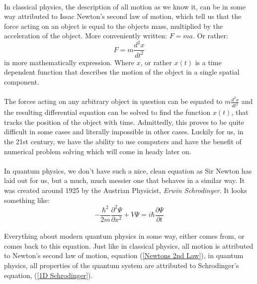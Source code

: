 \documentclass[12pt,letterpaper]{book}
\begin{document}
\paragraph*{}In classical physics, the description of all motion as we know it, can be in some way attributed to Issac Newton's second law of motion, which tell us that the force acting on an object is equal to the objects mass, multiplied by the acceleration of the object. More conveniently written: $F = ma$. Or rather:
\begin{equation}
\label{Newtons 2nd Law}
F = m\frac{d^2x}{dt^2}
\end{equation} 
in more mathematically expression. Where $x$, or rather $x(t)$ is a time dependent function that describes the motion of the object in a single spatial component.
\paragraph*{}The forces acting on any arbitrary object in question can be equated to $m\frac{d^2x}{dt^2}$ and the resulting differential equation can be solved to find the function $x(t)$, that tracks the position of the object with time. Admittedly, this proves to be quite difficult in some cases and literally impossible in other cases. Luckily for us, in the 21st century, we have the ability to use computers and have the benefit of numerical problem solving which will come in heady later on.
\paragraph*{}In quantum physics, we don't have such a nice, clean equation as Sir Newton has laid out for us, but a much, much messier one that behaves in a similar way. It was created around 1925 by the Austrian Physicist, \textit{Erwin Schrodinger}. It looks something like:
\begin{equation}
\label{1D Schrodinger}
-\frac{\hbar^2}{2m}\frac{\partial^2\Psi}{\partial x^2} +
V\Psi = i\hbar\frac{\partial \Psi}{\partial t}
\end{equation}
\paragraph*{}Everything about modern quantum physics in some way, either comes from, or comes back to this equation. Just like in classical physics, all motion is attributed to Newton's second law of motion, equation (\ref{Newtons 2nd Law}), in quantum physics, all properties of the quantum system are attributed to Schrodinger's equation, (\ref{1D Schrodinger}).
\end{document}
